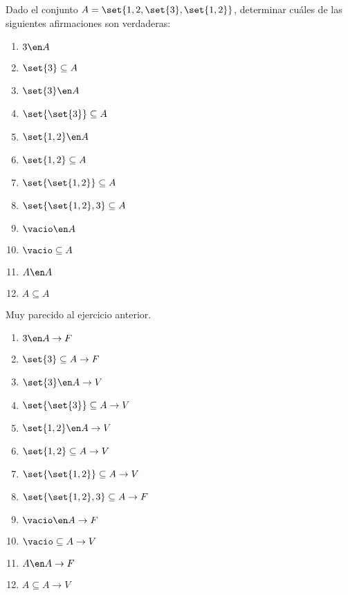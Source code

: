 \begin{enunciado}{\ejercicio}
  Dado el conjunto $A = \set{1,2,\set{3},\set{1,2}}$,
  determinar cuáles de las siguientes afirmaciones son verdaderas:
  \begin{multicols}{4}
    \begin{enumerate}[label=(\roman*)]
      \item $3 \en A         $
      \item $\set{3} \subseteq A $
      \item $\set{3} \en A    $
      \item $\set{\set{3}} \subseteq A $
      \item $\set{1,2} \en A $
      \item $\set{1,2} \subseteq A  $
      \item $\set{\set{1,2}} \subseteq A  $
      \item $\set{\set{1,2}, 3} \subseteq A  $
      \item $\vacio \en A  $
      \item $\vacio \subseteq A  $
      \item $A \en A  $
      \item $A \subseteq A  $
    \end{enumerate}
  \end{multicols}
\end{enunciado}

Muy parecido al ejercicio anterior.

\begin{multicols}{3}
  \begin{enumerate}[label=(\roman*)]
    \item $3 \en A \to F  $

    \item $\set{3} \subseteq A \to F$

    \item $\set{3} \en A    \to V$

    \item $\set{\set{3}} \subseteq A \to V$

    \item $\set{1,2} \en A \to V$

    \item $\set{1,2} \subseteq A \to V $

    \item $\set{\set{1,2}} \subseteq A \to V $

    \item $\set{\set{1,2}, 3} \subseteq A \to F$

    \item $\vacio \en A \to F $

    \item $\vacio \subseteq A \to V $

    \item $A \en A \to F $

    \item $A \subseteq A \to V $
  \end{enumerate}
\end{multicols}

\begin{aportes}
  \item {}
  \item {}
\end{aportes}
